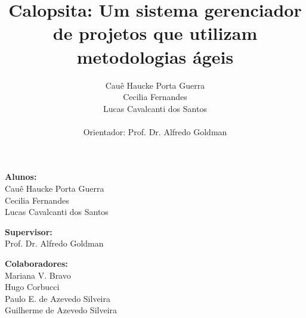 \documentclass[titlepage,a4paper]{article}
\title{Calopsita: Um sistema gerenciador de projetos que utilizam metodologias ágeis}
\author{Cauê Haucke Porta Guerra\\Cecilia Fernandes\\Lucas Cavalcanti dos Santos\\ \\Orientador: Prof. Dr. Alfredo Goldman}
\begin{document}
	

\maketitle

\begin{description} 
\item{\textbf{Alunos:}\\Cauê Haucke Porta Guerra\\Cecilia Fernandes\\Lucas Cavalcanti dos Santos}
\item{\textbf{Supervisor:}\\Prof. Dr. Alfredo Goldman}
\item{\textbf{Colaboradores:}\\Mariana V. Bravo\\Hugo Corbucci\\Paulo E. de Azevedo Silveira\\Guilherme de Azevedo Silveira}
\end{description}










\end{document}
